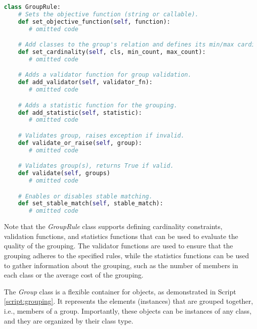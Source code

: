         \begin{lstlisting}[language=Python, caption={\textit{GroupRule} class that defines valid \textit{Groups} and its specifications. Such as min/max cardinality of each relation, group validation functions, statistic functions, and object function.}, label={script:groupingrule}]
class GroupRule:
    # Sets the objective function (string or callable).
    def set_objective_function(self, function):
       # omitted code

    # Add classes to the group's relation and defines its min/max cardinality relation.
    def set_cardinality(self, cls, min_count, max_count):
       # omitted code

    # Adds a validator function for group validation.
    def add_validator(self, validator_fn):
       # omitted code

    # Adds a statistic function for the grouping.
    def add_statistic(self, statistic):
       # omitted code

    # Validates group, raises exception if invalid.
    def validate_or_raise(self, group):
       # omitted code

    # Validates group(s), returns True if valid.
    def validate(self, groups)
       # omitted code

    # Enables or disables stable matching.
    def set_stable_match(self, stable_match):
       # omitted code
\end{lstlisting}

    Note that the \textit{GroupRule} class supports defining cardinality constraints, validation functions, and statistics functions that can be used to evaluate the quality of the grouping.
    The validator functions are used to ensure that the grouping adheres to the specified rules, while the statistics functions can be used to gather information about the grouping, such as the number of members in each class or the average cost of the grouping.

    The \textit{Group} class is a flexible container for objects, as demonstrated in Script \ref{script:grouping}.
    It represents the elements (instances) that are grouped together, i.e., members of a group.
    Importantly, these objects can be instances of any class, and they are organized by their class type.

